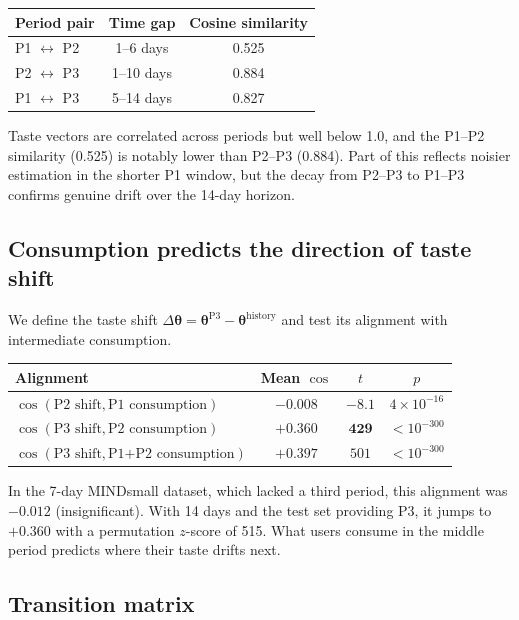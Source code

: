 \documentclass[11pt]{article}
\begin{document}
\begin{center}
\begin{tabular}{lcc}
\toprule
Period pair & Time gap & Cosine similarity \\
\midrule
P1 $\leftrightarrow$ P2 & 1--6 days & 0.525 \\
P2 $\leftrightarrow$ P3 & 1--10 days & 0.884 \\
P1 $\leftrightarrow$ P3 & 5--14 days & 0.827 \\
\bottomrule
\end{tabular}
\end{center}

Taste vectors are correlated across periods but well below 1.0, and the P1--P2 similarity (0.525) is notably lower than P2--P3 (0.884). Part of this reflects noisier estimation in the shorter P1 window, but the decay from P2--P3 to P1--P3 confirms genuine drift over the 14-day horizon.

\subsection*{Consumption predicts the direction of taste shift}

We define the taste shift $\Delta\boldsymbol{\theta} = \boldsymbol{\theta}^{\text{P3}} - \boldsymbol{\theta}^{\text{history}}$ and test its alignment with intermediate consumption.

\begin{center}
\begin{tabular}{lccc}
\toprule
Alignment & Mean $\cos$ & $t$ & $p$ \\
\midrule
$\cos(\text{P2 shift}, \text{P1 consumption})$ & $-0.008$ & $-8.1$ & $4 \times 10^{-16}$ \\
$\cos(\text{P3 shift}, \text{P2 consumption})$ & $\mathbf{+0.360}$ & $\mathbf{429}$ & $< 10^{-300}$ \\
$\cos(\text{P3 shift}, \text{P1+P2 consumption})$ & $+0.397$ & $501$ & $< 10^{-300}$ \\
\bottomrule
\end{tabular}
\end{center}

In the 7-day MINDsmall dataset, which lacked a third period, this alignment was $-0.012$ (insignificant). With 14 days and the test set providing P3, it jumps to $+0.360$ with a permutation $z$-score of 515. What users consume in the middle period predicts where their taste drifts next.

\subsection*{Transition matrix}
\end{document}
